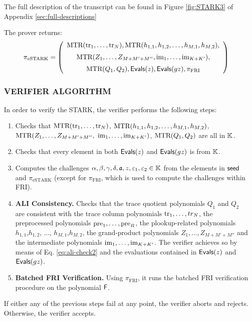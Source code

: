 
The full description of the transcript can be found in Figure \ref{fig:STARK3} of Appendix \ref{sec:full-descriptions}

The prover returns:
\[
\pi_{\text{eSTARK}} = 
\left(
\begin{array}{c}
\text{MTR}(\text{tr}_1,\dots,\text{tr}_N), \text{MTR}(h_{1,1},h_{1,2}, \dots, h_{M,1},h_{M,2}), \\[0.2cm]
\text{MTR}(Z_1,\dots,Z_{M+M'+M''},\text{im}_1,\dots,\text{im}_{K+K'}),\\[0.2cm]
\text{MTR}(Q_1,Q_2),\textsf{Evals}(z),\textsf{Evals}(gz), \pi_{\text{FRI}}
\end{array}
\right)
\]



\subsubsection*{VERIFIER ALGORITHM}

In order to verify the STARK, the verifier performs the following steps:
\begin{enumerate}
  \item Checks that $\text{MTR}(\text{tr}_1,\dots,\text{tr}_N)$, $\text{MTR}(h_{1,1},h_{1,2}, \dots, h_{M,1},h_{M,2})$, $\text{MTR}(Z_1,\dots,Z_{M+M'+M''},$ $\text{im}_1,\dots,\text{im}_{K+K'})$, $\text{MTR}(Q_1,Q_2)$ are all in $\mathbb{K}$.
  \item Checks that every element in both $\textsf{Evals}(z)$ and $\textsf{Evals}(gz)$ is from $\mathbb{K}$.
  \item Computes the challenges $\alpha,\beta,\gamma,\delta,\mathfrak{a},z,\varepsilon_1,\varepsilon_2 \in \mathbb{K}$ from the elements in $\textsf{seed}$ and $\pi_{\text{eSTARK}}$ (except for $\pi_{\text{FRI}}$, which is used to compute the challenges within FRI).
  
  \item \textbf{ALI Consistency.} Checks that the trace quotient polynomials $Q_1$ and $Q_2$ are consistent with the trace column polynomials $\text{tr}_1,\dots,tr_N$, the preprocessed polynomials $\text{pre}_1,\dots,\text{pre}_R$, the plookup-related polynomials $h_{1,1}$,$h_{1,2}$, $\dots$, $h_{M,1}$,$h_{M,2}$, the grand-product polynomials $Z_1, \dots, Z_{M+M'+M''}$ and the intermediate polynomials $\text{im}_1,\dots,\text{im}_{K+K'}$. The verifier achieves so by means of Eq. \eqref{eq:ali-check2} and the evaluations contained in $\textsf{Evals}(z)$ and $\textsf{Evals}(gz)$.
  
  \item \textbf{Batched FRI Verification.} Using $\pi_{\text{FRI}}$, it runs the batched FRI verification procedure on the polynomial $\textsf{F}$.
\end{enumerate}

If either any of the previous steps fail at any point, the verifier aborts and rejects. Otherwise, the verifier accepts.

